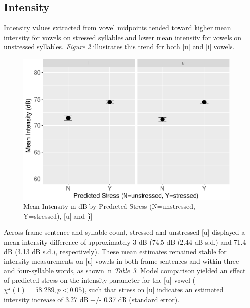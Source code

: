 \documentclass[english,man]{apa6}
\theoremstyle{definition}
\theoremstyle{definition}
\theoremstyle{definition}
\theoremstyle{remark}
\begin{document}
\subsection{Intensity}\label{intensity}

Intensity values extracted from vowel midpoints tended toward higher
mean intensity for vowels on stressed syllables and lower mean intensity
for vowels on unstressed syllables. \textit{Figure 2} illustrates this
trend for both {[}u{]} and {[}i{]} vowels.

\begin{figure}
\centering
\includegraphics{lithuanian_article_files/figure-latex/Figure3-1.pdf}
\caption{\label{fig:Figure3}Mean Intensity in dB by Predicted Stress
(N=unstressed, Y=stressed), {[}u{]} and {[}i{]}}
\end{figure}

Across frame sentence and syllable count, stressed and unstressed
{[}u{]} displayed a mean intensity difference of approximately 3 dB
(74.5 dB (2.44 dB s.d.) and 71.4 dB (3.13 dB s.d.), respectively). These
mean estimates remained stable for intensity measurements on {[}u{]}
vowels in both frame sentences and within three- and four-syllable
words, as shown in \textit{Table 3}. Model comparison yielded an effect
of predicted stress on the intensity parameter for the {[}u{]} vowel
(\(\chi^2(1) = 58.289, p < 0.05\)), such that stress on {[}u{]}
indicates an estimated intensity increase of 3.27 dB +/- 0.37 dB
(standard error).
\end{document}
